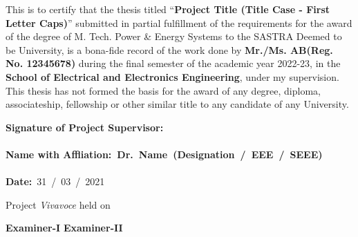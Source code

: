 \documentclass[a4paper, 12pt, oneside]{sastra1}
\begin{document}
	\certificate
	
	
	\begin{doublespace}
		\linespread{2}
		
		This is to certify that the thesis titled ``\textbf{Project Title (Title Case - First Letter Caps)}'' submitted in partial fulfillment of the requirements for the award of the degree of M. Tech. Power \& Energy Systems to the SASTRA Deemed to be University, is a bona-fide record of the work done by \textbf{Mr./Ms. AB(Reg. No. 12345678)} during the final semester of the academic year 2022-23, in the \textbf{School of Electrical and Electronics Engineering}, under my supervision. This thesis has not formed the basis for the award of any degree, diploma, associateship, fellowship or other similar title to any candidate of any University.
		
	\end{doublespace}
	\vspace*{0.4in}
	
	\noindent\textbf{Signature of Project Supervisor:}~	\\ %
	\\
	\textbf{Name with Affliation\hspace*{19mm}:~\textbf{Dr.~Name}~(Designation~/~EEE~/~SEEE)}	\\
	\\
	\textbf{Date\hspace*{48.25mm}:}~31~/~03~/~2021\\%
	
	\vspace*{0.35in}
	
	\noindent Project \textit{Vivavoce} held on
	
	\vspace*{0.50in}
	\noindent \textbf{Examiner-I} \hspace*{120mm} \textbf{Examiner-II}
	
	
	\declaration
	
	
\end{document}
